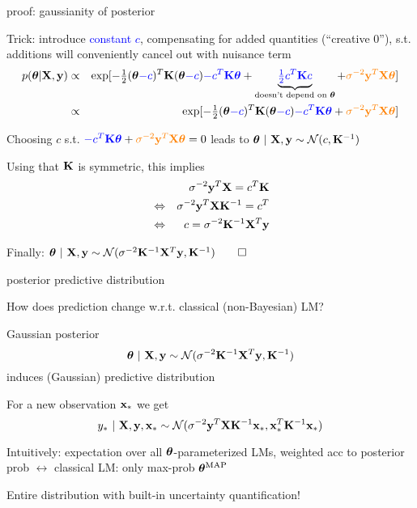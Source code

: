 \documentclass[11pt,compress,t,notes=noshow, xcolor=table]{beamer}
\begin{document}
\begin{framei}[fs=small]{proof: gaussianity of posterior}
\item Trick: introduce \textcolor{blue}{constant $c$}, compensating for added quantities  (``creative 0''), s.t. additions will conveniently cancel out with nuisance term
\begin{eqnarray*}
	p(\bm{\theta} | \mathbf{X}, \mathbf{y}) &\propto&  \exp[-\tfrac{1}{2}(\bm{\theta} \textcolor{blue}{- c})^T\mathbf{K}  (\bm{\theta} \textcolor{blue}{- c}) \textcolor{blue}{- c^T \mathbf{K} \bm{\theta}} + \underbrace{\textcolor{blue}{\tfrac{1}{2}c^T\mathbf{K} c}}_{\text{doesn't depend on } \bm{\theta}} + \textcolor{orange}{\sigma^{-2} \mathbf{y}^T \mathbf{X} \bm{\theta}} ] \\
	&\propto& \exp [-\tfrac{1}{2}(\bm{\theta} \textcolor{blue}{- c})^T\mathbf{K}  (\bm{\theta} \textcolor{blue}{- c}) \textcolor{blue}{- c^T \mathbf{K} \bm{\theta}} + \textcolor{orange}{\sigma^{-2} \mathbf{y}^T \mathbf{X} \bm{\theta}} ]
\end{eqnarray*}
\item Choosing $c$  s.t. 
$\textcolor{blue}{- c^T \mathbf{K} \bm{\theta}} + \textcolor{orange}{\sigma^{-2} \mathbf{y}^T \mathbf{X} \bm{\theta}} = 0$ 
leads to 
$\bm{\theta} ~|~ \mathbf{X}, \mathbf{y} \sim \mathcal{N}(c, \mathbf{K}^{-1})$
\item Using that $\mathbf{K}$ is symmetric, this implies 
\begin{eqnarray*}
&& \sigma^{-2} \mathbf{y}^T \mathbf{X} = c^T\mathbf{K} \\
&\Leftrightarrow & \sigma^{-2} \mathbf{y}^T \mathbf{X} \mathbf{K}^{-1} = c^T \\
&\Leftrightarrow& c = \sigma^{-2} \mathbf{K}^{-1} \mathbf{X}^T \mathbf{y}
\end{eqnarray*}
\item Finally: $\bm{\theta} ~|~ \mathbf{X}, \mathbf{y} \sim  \mathcal{N}(\sigma^{-2}\mathbf{K}^{-1}\mathbf{X}^T\mathbf{y}, \mathbf{K}^{-1}) \qed$
\end{framei}

\begin{framei}[sep=L]{posterior predictive distribution}
\item How does prediction change w.r.t. classical (non-Bayesian) LM?
\item Gaussian posterior   
$$
\bm{\theta} ~|~ \mathbf{X}, \mathbf{y} \sim  \mathcal{N}(\sigma^{-2}\mathbf{K}^{-1}\mathbf{X}^T\mathbf{y}, \mathbf{K}^{-1})
$$
induces (Gaussian) predictive distribution
\item For a new observation $\mathbf{x}_*$ we get
$$
y_* ~|~ \mathbf{X}, \mathbf{y}, \mathbf{x}_* \sim \mathcal{N}(\sigma^{-2}\mathbf{y}^T \mathbf{X} \mathbf{K}^{-1}\mathbf{x}_*, \mathbf{x}_*^T\mathbf{K}^{-1}\mathbf{x}_*)
$$
\item Intuitively: expectation over all $\bm{\theta}$-parameterized LMs, weighted acc to posterior prob $\leftrightarrow$ classical LM: only max-prob $\bm{\theta}^{\text{MAP}}$
\item Entire distribution with built-in uncertainty quantification!
\end{framei}
\end{document}
